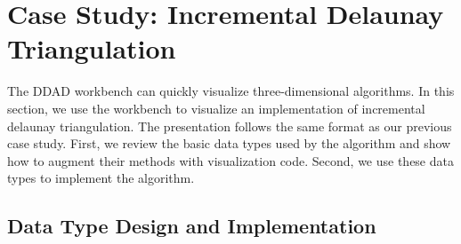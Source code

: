 \FloatBarrier
\section{Case Study: Incremental Delaunay Triangulation}
\label{sec:case-delaunay}


The DDAD workbench can quickly visualize three-dimensional algorithms. In this
section, we use the workbench to visualize an implementation of incremental
delaunay triangulation. The presentation follows the same format as our previous
case study. First, we review the basic data types used by the algorithm and
show how to augment their methods with visualization code. Second, we use these
data types to implement the algorithm.

\subsection{Data Type Design and Implementation}





% 

